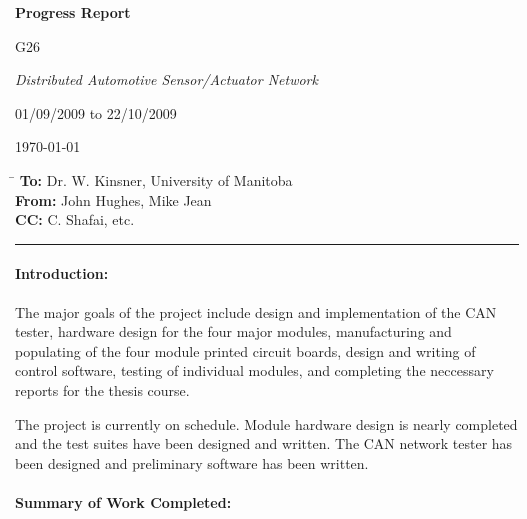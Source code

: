 \textwidth=6in
\textheight=8in
\topmargin=0.5in
\oddsidemargin=0.25in
\evensidemargin=0.25in
\headheight=0in
\footheight=0in
\headsep=0in


\centerline{\Large \bf Progress Report}
\bigskip
\bigskip

 G26
\bigskip

 {\it Distributed Automotive Sensor/Actuator Network}
\bigskip

 01/09/2009 to 22/10/2009
\bigskip

 \today

\begin{tabbing}
 \hspace{50pt}\=\kill
 {\bf To:} \> Dr. W. Kinsner, University of Manitoba \\ 
 {\bf From:} \> John Hughes, Mike Jean \\
 {\bf CC:} \> C. Shafai, etc.
\end{tabbing}

\hrule
\bigskip

\paragraph{Introduction:}

The major goals of the project include design and implementation of the CAN tester, hardware design for the four major modules, manufacturing and populating of the four module printed circuit boards, design and writing of control software, testing of individual modules, and completing the neccessary reports for the thesis course. 

The project is currently on schedule. Module hardware design is nearly completed and the test suites have been designed and written. The CAN network tester has been designed and preliminary software has been written.

\paragraph{Summary of Work Completed:}

